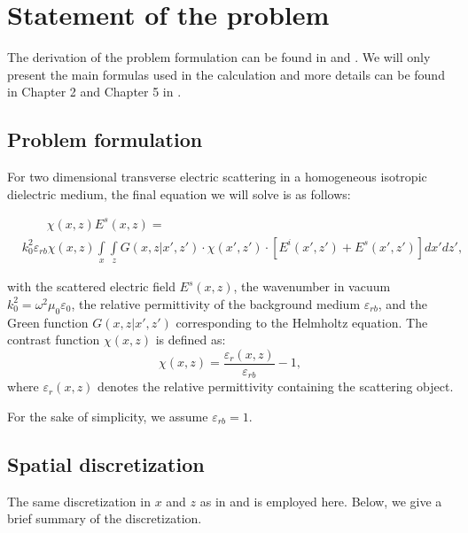 \documentclass[preprint,12pt]{elsarticle}
\begin{document}
\section{Statement of the problem}
\label{Statement of the problem}
The derivation of the problem formulation can be found in  \cite{Dilz2016The} and \cite{RJDilz2017spatialspectral}. We will only present the main formulas used in the calculation and more details can be found in Chapter 2 and Chapter 5 in \cite{RJDilz2017spatialspectral}. 

\subsection{Problem formulation}
For two dimensional transverse electric scattering in a homogeneous isotropic dielectric medium, the final equation we will solve is as follows:
 \begin{small}
 \begin{equation}
 \begin{split}
 &\qquad \chi(x,z)E^s(x,z) = \\
 & k^2_0\varepsilon_{rb}\chi(x,z)\int \limits_x\int \limits_z G(x,z|x',z')\cdot\chi(x',z') \cdot  [E^i(x',z') + E^s(x',z')]dx'dz',
 \end{split}
 \end{equation}
 \end{small}
 with the scattered electric field $E^s(x,z) $, the wavenumber in vacuum $k^2_0 = \omega^2 \mu_0 \varepsilon_0$, the relative permittivity of the background medium $\varepsilon_{rb}$, and  the Green function $G(x,z|x',z')$ corresponding to the Helmholtz equation. The contrast function $\chi(x,z)$ is defined as:
 \begin{equation}
 \chi (x,z) = \frac{\varepsilon_r(x,z)}{\varepsilon_{rb}} - 1,
\end{equation}
 where $\varepsilon_r(x,z)$ denotes the relative permittivity containing the scattering object.
 
 For the sake of simplicity, we assume $\varepsilon_{rb} = 1$.
 
\subsection{Spatial discretization}
The same discretization in $x$ and $z$ as in \cite{Dilz2016The} and \cite{RJDilz2017spatialspectral} is employed here. Below, we give a brief summary of the discretization.
\end{document}
